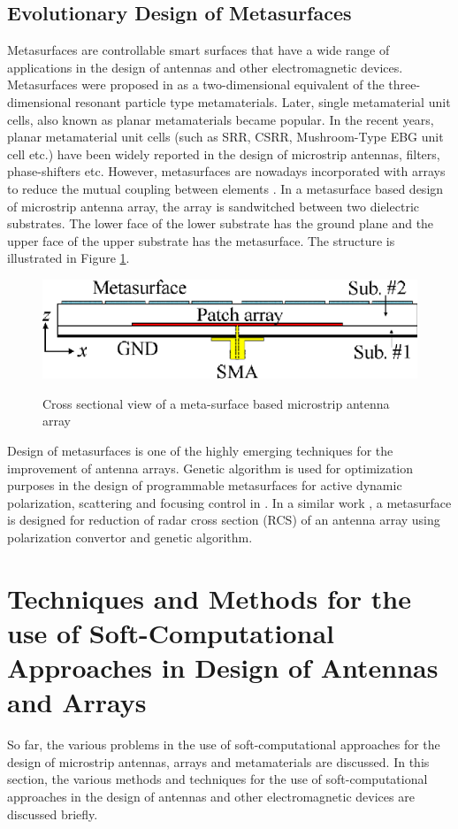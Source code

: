 \subsection{Evolutionary Design of Metasurfaces}
Metasurfaces are controllable smart surfaces that have a wide range of applications in the design of antennas and other electromagnetic devices. Metasurfaces were proposed in \cite{metasurface1} as a two-dimensional equivalent of the three-dimensional resonant particle type metamaterials. Later, single metamaterial unit cells, also known as planar metamaterials became popular. In the recent years, planar metamaterial unit cells (such as SRR, CSRR, Mushroom-Type EBG unit cell etc.) have been widely reported in the design of microstrip antennas, filters, phase-shifters etc. However, metasurfaces are nowadays incorporated with arrays to reduce the mutual coupling between elements \cite{metasurface2}. In a metasurface based design of microstrip antenna array, the array is sandwitched between two dielectric substrates. The lower face of the lower substrate has the ground plane and the upper face of the upper substrate has the metasurface. The structure is illustrated in Figure \ref{fig_2_6}.

\begin{figure}
  \centering
  \includegraphics[width=0.6\linewidth]{fig_2_6.eps}\\
  \caption [Cross sectional view of a meta-surface based microstrip antenna array]{Cross sectional view of a meta-surface based microstrip antenna array \cite{metasurface2}} \label{fig_2_6}
\end{figure}

Design of metasurfaces is one of the highly emerging techniques for the improvement of antenna arrays. Genetic algorithm is used for optimization purposes in the design of programmable metasurfaces for active dynamic polarization, scattering and focusing control in \cite{softCompMeta}. In a similar work \cite{uwb_rcs}, a metasurface is designed for reduction of radar cross section (RCS) of an antenna array using polarization convertor and genetic algorithm.

\section{Techniques and Methods for the use of Soft-Computational Approaches in Design of Antennas and Arrays} \label{c2sec_methods}
So far, the various problems in the use of soft-computational approaches for the design of microstrip antennas, arrays and metamaterials are discussed. In this section, the various methods and techniques for the use of soft-computational approaches in the design of antennas and other electromagnetic devices are discussed briefly.

